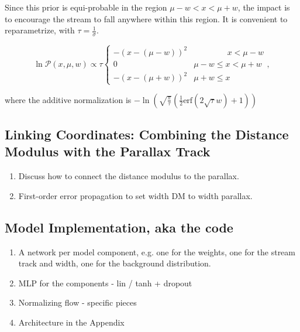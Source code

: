 \documentclass[twocolumn]{aastex631}
\newcommand{\mcal}[1]{\mathcal{#1}}
\newcommand{\pdf}{\mcal{P}}
\begin{document}
            Since this prior is equi-probable in the region $\mu - w < x < \mu + w$, the  impact is to encourage the stream to fall anywhere within this region. 
            It is convenient to reparametrize, with $\tau = \frac{1}{\sigma}$.
            \begin{small}
            \begin{equation}
                \ln \pdf(x,\mu,w) \propto \tau \begin{cases} 
                    -\left(x-(\mu-w)\right)^2 & \phantom{\mu - w <}\ x < \mu - w \\
                    0 & \mu - w \leq x < \mu + w \\
                    -\left(x-(\mu+w)\right)^2 & \mu + w \leq x
                \end{cases},
            \end{equation}\end{small}
            where the additive normalization is 
            $-\ln\left(\sqrt{\frac{\pi}{\tau}} \left(\frac{1}{2}\text{erf}\left(2 \sqrt{\tau } w\right)+1\right)\right)$


    \subsection{Linking Coordinates: Combining the Distance Modulus with the Parallax Track}

        \begin{enumerate}
            \item Discuss how to connect the distance modulus to the parallax.
            \item First-order error propagation to set width DM to width parallax.
        \end{enumerate}


    \subsection{Model Implementation, aka the code} \label{sub:model_implementation}


        \begin{enumerate}
            \item A network per model component, e.g. one for the weights, one for the stream track and width, one for the background distribution.
            \item MLP for the components - lin / tanh + dropout
            \item Normalizing flow - specific pieces
            \item Architecture in the Appendix
        \end{enumerate}
\end{document}
